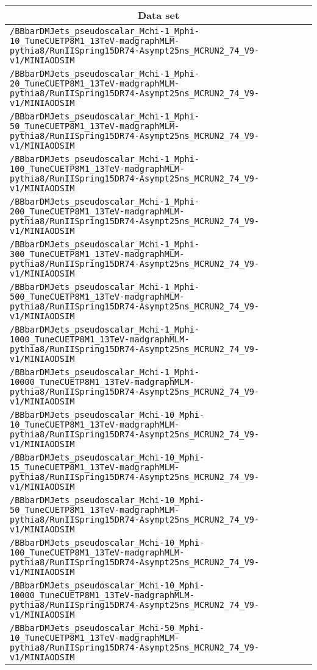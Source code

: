 \begin{center}
\begin{tabular}{l}
\hline\hline
\multicolumn{1}{c}{Data set}\tabularnewline
\hline
\verb!/BBbarDMJets_pseudoscalar_Mchi-1_Mphi-10_TuneCUETP8M1_13TeV-madgraphMLM-pythia8/RunIISpring15DR74-Asympt25ns_MCRUN2_74_V9-v1/MINIAODSIM! \tabularnewline
\verb!/BBbarDMJets_pseudoscalar_Mchi-1_Mphi-20_TuneCUETP8M1_13TeV-madgraphMLM-pythia8/RunIISpring15DR74-Asympt25ns_MCRUN2_74_V9-v1/MINIAODSIM! \tabularnewline
\verb!/BBbarDMJets_pseudoscalar_Mchi-1_Mphi-50_TuneCUETP8M1_13TeV-madgraphMLM-pythia8/RunIISpring15DR74-Asympt25ns_MCRUN2_74_V9-v1/MINIAODSIM! \tabularnewline
\verb!/BBbarDMJets_pseudoscalar_Mchi-1_Mphi-100_TuneCUETP8M1_13TeV-madgraphMLM-pythia8/RunIISpring15DR74-Asympt25ns_MCRUN2_74_V9-v1/MINIAODSIM! \tabularnewline
\verb!/BBbarDMJets_pseudoscalar_Mchi-1_Mphi-200_TuneCUETP8M1_13TeV-madgraphMLM-pythia8/RunIISpring15DR74-Asympt25ns_MCRUN2_74_V9-v1/MINIAODSIM! \tabularnewline
\verb!/BBbarDMJets_pseudoscalar_Mchi-1_Mphi-300_TuneCUETP8M1_13TeV-madgraphMLM-pythia8/RunIISpring15DR74-Asympt25ns_MCRUN2_74_V9-v1/MINIAODSIM! \tabularnewline
\verb!/BBbarDMJets_pseudoscalar_Mchi-1_Mphi-500_TuneCUETP8M1_13TeV-madgraphMLM-pythia8/RunIISpring15DR74-Asympt25ns_MCRUN2_74_V9-v1/MINIAODSIM! \tabularnewline
\verb!/BBbarDMJets_pseudoscalar_Mchi-1_Mphi-1000_TuneCUETP8M1_13TeV-madgraphMLM-pythia8/RunIISpring15DR74-Asympt25ns_MCRUN2_74_V9-v1/MINIAODSIM! \tabularnewline
\verb!/BBbarDMJets_pseudoscalar_Mchi-1_Mphi-10000_TuneCUETP8M1_13TeV-madgraphMLM-pythia8/RunIISpring15DR74-Asympt25ns_MCRUN2_74_V9-v1/MINIAODSIM! \tabularnewline
\verb!/BBbarDMJets_pseudoscalar_Mchi-10_Mphi-10_TuneCUETP8M1_13TeV-madgraphMLM-pythia8/RunIISpring15DR74-Asympt25ns_MCRUN2_74_V9-v1/MINIAODSIM! \tabularnewline
\verb!/BBbarDMJets_pseudoscalar_Mchi-10_Mphi-15_TuneCUETP8M1_13TeV-madgraphMLM-pythia8/RunIISpring15DR74-Asympt25ns_MCRUN2_74_V9-v1/MINIAODSIM! \tabularnewline
\verb!/BBbarDMJets_pseudoscalar_Mchi-10_Mphi-50_TuneCUETP8M1_13TeV-madgraphMLM-pythia8/RunIISpring15DR74-Asympt25ns_MCRUN2_74_V9-v1/MINIAODSIM! \tabularnewline
\verb!/BBbarDMJets_pseudoscalar_Mchi-10_Mphi-100_TuneCUETP8M1_13TeV-madgraphMLM-pythia8/RunIISpring15DR74-Asympt25ns_MCRUN2_74_V9-v1/MINIAODSIM! \tabularnewline
\verb!/BBbarDMJets_pseudoscalar_Mchi-10_Mphi-10000_TuneCUETP8M1_13TeV-madgraphMLM-pythia8/RunIISpring15DR74-Asympt25ns_MCRUN2_74_V9-v1/MINIAODSIM! \tabularnewline
\verb!/BBbarDMJets_pseudoscalar_Mchi-50_Mphi-10_TuneCUETP8M1_13TeV-madgraphMLM-pythia8/RunIISpring15DR74-Asympt25ns_MCRUN2_74_V9-v1/MINIAODSIM! \tabularnewline

\end{tabular}
\end{center}
